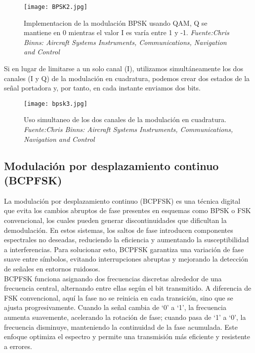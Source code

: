  \begin{figure}[H]
    \centering
    \texttt{[image: BPSK2.jpg]}
    \caption{\centering Implementacion de la modulación BPSK usando QAM, Q se mantiene en 0 mientras el valor I es varía entre 1 y -1.\textit{ Fuente:Chris Binns: Aircraft Systems Instruments, Communications, Navigation and Control}}
    \label{fig:bpsk2}
\end{figure}

Si en lugar de limitarse a un solo canal (I), utilizamos simultáneamente los dos canales (I y Q) de la modulación en cuadratura, podemos crear dos estados de la señal portadora y, por tanto, en cada instante enviamos dos bits.

 \begin{figure}[H]
    \centering
    \texttt{[image: bpsk3.jpg]}
    \caption{\centering Uso simultaneo de los dos canales de la modulación en cuadratura.\textit{ Fuente:Chris Binns: Aircraft Systems Instruments, Communications, Navigation and Control}}
    \label{fig:bpsk3}
\end{figure}


\subsection{Modulación por desplazamiento continuo (BCPFSK)}
La modulación por desplazamiento continuo (BCPFSK) es una técnica digital que evita los cambios abruptos de fase presentes en esquemas como BPSK o FSK convencional, los cuales pueden generar discontinuidades que dificultan la demodulación. En estos sistemas, los saltos de fase introducen componentes espectrales no deseadas, reduciendo la eficiencia y aumentando la susceptibilidad a interferencias. Para solucionar esto, BCPFSK garantiza una variación de fase suave entre símbolos, evitando interrupciones abruptas y mejorando la detección de señales en entornos ruidosos.\\

BCPFSK funciona asignando dos frecuencias discretas alrededor de una frecuencia central, alternando entre ellas según el bit transmitido. A diferencia de FSK convencional, aquí la fase no se reinicia en cada transición, sino que se ajusta progresivamente. Cuando la señal cambia de ‘0’ a ‘1’, la frecuencia aumenta suavemente, acelerando la rotación de fase; cuando pasa de ‘1’ a ‘0’, la frecuencia disminuye, manteniendo la continuidad de la fase acumulada. Este enfoque optimiza el espectro y permite una transmisión más eficiente y resistente a errores.\\

